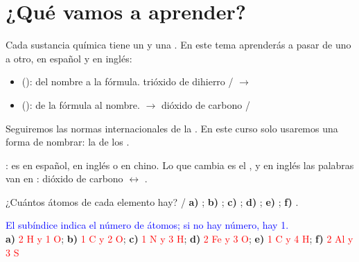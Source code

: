 \raggedbottom %

\section{¿Qué vamos a aprender?}

Cada sustancia química tiene un  y una . En este tema aprenderás a pasar de uno a otro, en español y en inglés:

\begin{itemize}
    \item {} (): del nombre a la fórmula. \quad trióxido de dihierro /  \(\to\) 
    \item {} (): de la fórmula al nombre. \quad {} \(\to\) dióxido de carbono / 
\end{itemize}

Seguiremos las normas internacionales de la . En este curso solo usaremos una forma de nombrar: la de los .

\begin{marker}
    :  es  en español, en inglés o en chino. Lo que cambia es el , y en inglés las palabras van en : dióxido de carbono \(\leftrightarrow\) .
\end{marker}


\begin{exercise}
    ¿Cuántos átomos de cada elemento hay? /  \textbf{a)} ; \textbf{b)} ; \textbf{c)} ; \textbf{d)} ; \textbf{e)} ; \textbf{f)} .
    \begin{solu}
        \textcolor{blue}{El subíndice indica el número de átomos; si no hay número, hay 1.}\\
        \textbf{a)} \textcolor{red}{2 H y 1 O}; \textbf{b)} \textcolor{red}{1 C y 2 O}; \textbf{c)} \textcolor{red}{1 N y 3 H}; \textbf{d)} \textcolor{red}{2 Fe y 3 O}; \textbf{e)} \textcolor{red}{1 C y 4 H}; \textbf{f)} \textcolor{red}{2 Al y 3 S}
    \end{solu}
\end{exercise}

